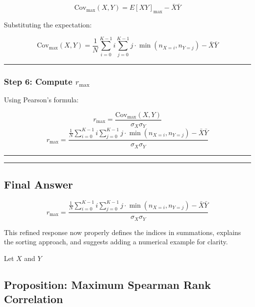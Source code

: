 \documentclass[
  12pt,
  letterpaper,
  DIV=11,
  numbers=noendperiod]{scrartcl}
\begin{document}
\[\text{Cov}_{\max}(X,Y) = E[XY]_{\max} - \bar{X} \bar{Y}\]

Substituting the expectation:

\[\text{Cov}_{\max}(X,Y) = \frac{1}{N} \sum_{i=0}^{K-1} i \sum_{j=0}^{K-1} j \cdot \min(n_{X=i}, n_{Y=j}) - \bar{X} \bar{Y}\]

\begin{center}\rule{0.5\linewidth}{0.5pt}\end{center}

\subsubsection{\texorpdfstring{\textbf{Step 6: Compute
\(r_{\max}\)}}{Step 6: Compute r\_\{\textbackslash max\}}}\label{step-6-compute-r_max}

Using Pearson's formula:

\[r_{\max} = \frac{\text{Cov}_{\max}(X, Y)}{\sigma_X \sigma_Y}\]
\[r_{\max} =  
\frac{\frac{1}{N} \sum_{i=0}^{K-1} i \sum_{j=0}^{K-1} j \cdot \min(n_{X=i}, n_{Y=j}) - \bar{X} \bar{Y}}  
{\sigma_X \sigma_Y}\]

\begin{center}\rule{0.5\linewidth}{0.5pt}\end{center}

\begin{center}\rule{0.5\linewidth}{0.5pt}\end{center}

\subsection{\texorpdfstring{\textbf{Final
Answer}}{Final Answer}}\label{final-answer}

\[r_{\max} =  
\frac{\frac{1}{N} \sum_{i=0}^{K-1} i \sum_{j=0}^{K-1} j \cdot \min(n_{X=i}, n_{Y=j}) - \bar{X} \bar{Y}}  
{\sigma_X \sigma_Y}\]

This refined response now properly defines the indices in summations,
explains the sorting approach, and suggests adding a numerical example
for clarity.

\begin{proposition}
Let $X$ and $Y$


\end{proposition}

\subsection{Proposition: Maximum Spearman Rank
Correlation}\label{proposition-maximum-spearman-rank-correlation}
\end{document}
